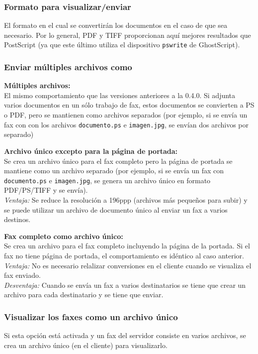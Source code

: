 \documentclass[a4paper,10pt]{scrartcl}
\begin{document}
\subsubsection{Formato para visualizar/enviar}

El formato en el cual se convertirán los documentos en el caso de que sea necesario. Por lo general, PDF y TIFF proporcionan aquí mejores resultados que PostScript (ya que este último utiliza el dispositivo \texttt{pswrite} de GhostScript).

\subsubsection{Enviar múltiples archivos como}

{\parindent0pt
\textbf{Múltiples archivos:}\\
El mismo comportamiento que las versiones anteriores a la 0.4.0. Si adjunta varios documentos en un sólo trabajo de fax, estos documentos se convierten a PS o PDF, pero se mantienen como archivos separados (por ejemplo, si se envía un fax con con los archivos \texttt{documento.ps} e \texttt{imagen.jpg}, se envían dos archivos por separado)
\medskip

\textbf{Archivo único excepto para la página de portada:}\\
Se crea un archivo único para el fax completo pero la página de portada se mantiene como un archivo separado (por ejemplo, si se envía un fax con \texttt{documento.ps} e \texttt{imagen.jpg}, se genera un archivo único en formato PDF/PS/TIFF y se envía).\\
\textit{Ventaja:} Se reduce la resolución a 196ppp (\textrightarrow archivos más pequeños para subir) y se puede utilizar un archivo de documento único al enviar un fax a varios destinos.
\medskip

\textbf{Fax completo como archivo único:}\\
Se crea un archivo para el fax completo incluyendo la página de la portada. Si el fax no tiene página de portada, el comportamiento es idéntico al caso anterior.\\
\textit{Ventaja:} No es necesario relalizar conversiones en el cliente cuando se visualiza el fax enviado.\\
\textit{Desventaja:} Cuando se envía un fax a varios destinatarios se tiene que crear un archivo para cada destinatario y se tiene que enviar.
}

\subsubsection{Visualizar los faxes como un archivo único}
Si esta opción está activada y un fax del servidor consiste en varios archivos, se crea un archivo único (en el cliente) para visualizarlo.
\end{document}
